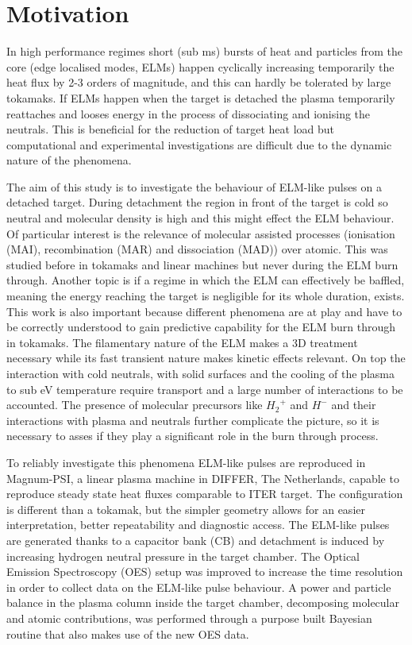 

\section{Motivation}\label{Motivation magnum-psi}


In high performance regimes short (sub ms) bursts of heat and particles from the core (edge localised modes, ELMs) happen cyclically increasing temporarily the heat flux by 2-3 orders of magnitude, and this can hardly be tolerated by large tokamaks. \cite{Jachmich2011} If ELMs happen when the target is detached the plasma temporarily reattaches and looses energy in the process of dissociating and ionising the neutrals. This is beneficial for the reduction of target heat load but computational and experimental investigations are difficult due to the dynamic nature of the phenomena.

The aim of this study is to investigate the behaviour of ELM-like pulses on a detached target. During detachment the region in front of the target is cold so neutral and molecular density is high and this might effect the ELM behaviour. Of particular interest is the relevance of molecular assisted processes (ionisation (MAI), recombination (MAR) and dissociation (MAD)) over atomic. This was studied before in tokamaks and linear machines but never during the ELM burn through. \cite{Akkermans2020,Verhaegh2021a} Another topic is if a regime in which the ELM can effectively be baffled, meaning the energy reaching the target is negligible for its whole duration, exists. This work is also important because different phenomena are at play and have to be correctly understood to gain predictive capability for the ELM burn through in tokamaks. The filamentary nature of the ELM makes a 3D treatment necessary\cite{Smith2020,Smith2020a} while its fast transient nature makes kinetic effects relevant.\cite{Mijin2020} On top the interaction with cold neutrals, with solid surfaces and the cooling of the plasma to sub eV temperature require transport and a large number of interactions to be accounted.\cite{Zhou2022,Tskhakaya2009} The presence of molecular precursors like ${H_2}^+$ and $H^-$ and their interactions with plasma and neutrals further complicate the picture, so it is necessary to asses if they play a significant role in the burn through process.

To reliably investigate this phenomena ELM-like pulses are reproduced in Magnum-PSI, a linear plasma machine in DIFFER, The Netherlands, capable to reproduce steady state heat fluxes comparable to ITER target. The configuration is different than a tokamak, but the simpler geometry allows for an easier interpretation, better repeatability and diagnostic access. The ELM-like pulses are generated thanks to a capacitor bank (CB) and detachment is induced by increasing hydrogen neutral pressure in the target chamber.
The Optical Emission Spectroscopy (OES) setup was improved to increase the time resolution in order to collect data on the ELM-like pulse behaviour. A power and particle balance in the plasma column inside the target chamber, decomposing molecular and atomic contributions, was performed through a purpose built Bayesian routine that also makes use of the new OES data.

